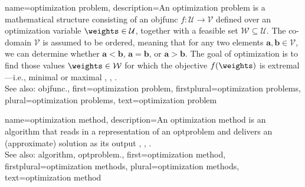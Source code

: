 {name={optimization problem}, 
	description={An optimization problem is a mathematical 
		   structure consisting of an \gls{objfunc} $f: \mathcal{U} \rightarrow \mathcal{V}$ 
		   defined over an optimization variable $\weights \in \mathcal{U}$, together with a 
		   feasible set $\mathcal{W} \subseteq \mathcal{U}$. The co-domain $\mathcal{V}$ is 
		   assumed to be ordered, meaning that for any two elements $\mathbf{a}, \mathbf{b} \in \mathcal{V}$, 
		   we can determine whether $\mathbf{a} < \mathbf{b}$, $\mathbf{a} = \mathbf{b}$, 
		   or $\mathbf{a} > \mathbf{b}$. The goal of optimization is to find those values $\weights \in \mathcal{W}$ 
		   for which the objective $f(\weights)$ is extremal—i.e., minimal or maximal \cite{BoydConvexBook}, \cite{BertsekasNonLinProgr}, \cite{nesterov04}.
		   \\
		   See also: \gls{objfunc}.},
	first={optimization problem},
	firstplural={optimization problems}, 
	plural={optimization problems}, 
	text={optimization problem}
}

{name={optimization method},
	description={An optimization method is an \gls{algorithm} that 
		reads in a representation of an \gls{optproblem} and delivers an (approximate) solution 
		as its output \cite{BoydConvexBook}, \cite{BertsekasNonLinProgr}, \cite{nesterov04}.
		 \\
		 See also: \gls{algorithm}, \gls{optproblem}.},
	first={optimization method},
	firstplural={optimization methods}, 
	plural={optimization methods}, 
	text={optimization method}
}

